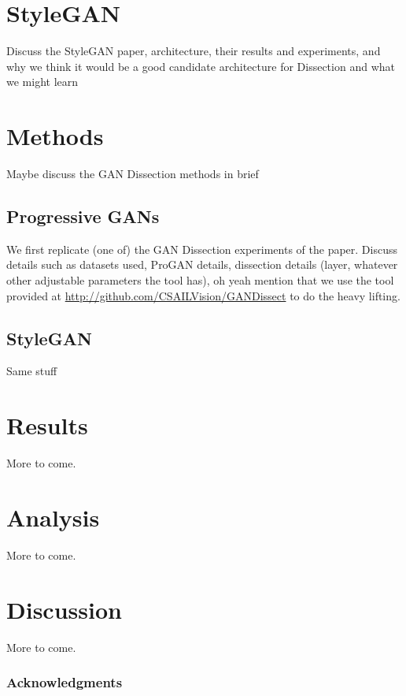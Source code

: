 \documentclass{article}
\begin{document}
\section{StyleGAN}

Discuss the StyleGAN paper, architecture, their results and experiments, and why we think it would be a good candidate architecture for Dissection and what we might learn

\section{Methods}

Maybe discuss the GAN Dissection methods in brief

\subsection{Progressive GANs}

We first replicate (one of) the GAN Dissection experiments of the paper. Discuss details such as datasets used, ProGAN details, dissection details (layer, whatever other adjustable parameters the tool has), oh yeah mention that we use the tool provided at \url{http://github.com/CSAILVision/GANDissect} to do the heavy lifting. 

\subsection{StyleGAN }

Same stuff

\section{Results}

More to come.

\section{Analysis}

More to come.

\section{Discussion}

More to come.

\subsubsection*{Acknowledgments}


\end{document}
